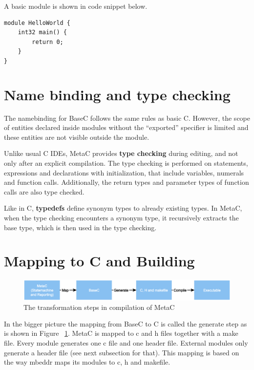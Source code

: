 \documentclass[a4paper,10pt,titlepage]{report}
\begin{document}
A basic module is shown in code snippet below.

\begin{lstlisting}
module HelloWorld {
    int32 main() {
        return 0;
    }
}
\end{lstlisting}



\section{Name binding and type checking}
The namebinding for BaseC follows the same rules as basic C. However, the scope of entities declared inside modules without the “exported” specifier is limited and these entities are not visible outside the module.

Unlike usual C IDEs, MetaC provides \textbf{type checking} during editing, and not only after an explicit compilation. The type checking is performed on statements, expressions and declarations with initialization, that include variables, numerals and function calls. Additionally, the return types and parameter types of function calls are also type checked.

Like in C, \textbf{typedefs} define synonym types to already existing types. In MetaC, when the type checking encounters a synonym type, it recursively extracts the base type, which is then used in the type checking.
 

\section{Mapping to C and Building}

\begin{figure}[ht!]
\centering
\includegraphics[width=\linewidth]{pics/compilation_simple.eps}
\caption{The transformation steps in compilation of MetaC}
\label{fig:compilation_simple}
\end{figure}

In the bigger picture the mapping from BaseC to C is called the generate step as is shown in Figure ~\ref{fig:compilation_simple}. MetaC is mapped to c and h files together with a make file. Every module generates one c file and one header file. External modules only generate a header file (see next subsection for that). This mapping is based on the way mbeddr maps its modules to c, h and makefile.
\end{document}
